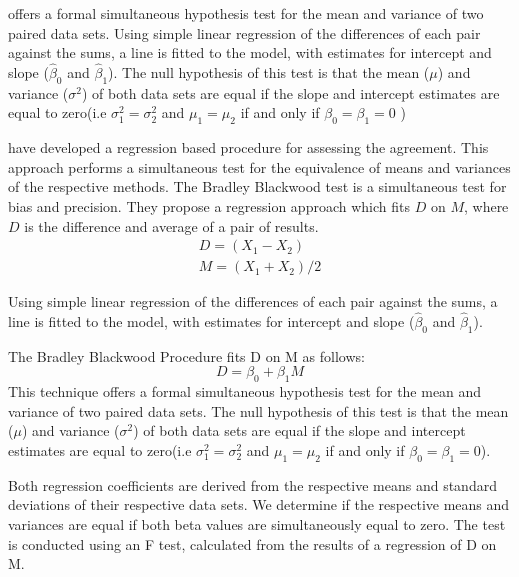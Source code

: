 \documentclass[12pt, a4paper]{report}
\theoremstyle{plain}
\theoremstyle{definition}
\theoremstyle{remark}
\begin{document}
\citet{BB89} offers a formal simultaneous hypothesis test for the
	mean and variance of two paired data sets. Using simple linear regression of the differences of each pair against the sums, a
	line is fitted to the model, with estimates for intercept and slope ($\hat{\beta}_{0}$ and $\hat{\beta}_{1}$). The null
	hypothesis of this test is that the mean ($\mu$) and variance
	($\sigma^{2}$) of both data sets are equal if the slope and intercept estimates are equal to zero(i.e $\sigma^{2}_{1} =
	\sigma^{2}_{2}$ and $\mu_{1}=\mu_{2}$ if and only if $\beta_{0}=
	\beta_{1}=0$ )	
	
	
	\citet{BB89} have developed a regression based procedure for
	assessing the agreement. This approach performs a simultaneous test for the equivalence of
	means and variances of the respective methods. The Bradley Blackwood test is a simultaneous test for bias and
	precision. They propose a regression approach which fits $D$ on $M$, where $D$ is the difference and average of a pair of results. 
	\begin{eqnarray}
	D = (X_{1}-X_{2}) \\
	M = (X_{1} + X_{2}) /2
	\end{eqnarray}
		
	Using simple linear regression of the differences of each pair against the sums, a line is fitted to the model, with estimates for intercept and slope ($\hat{\beta}_{0}$ and $\hat{\beta}_{1}$).

	The Bradley Blackwood Procedure fits D on M as follows:\\
	\begin{equation}
	D = \beta_{0} + \beta_{1}M
	\end{equation}
This technique offers a formal simultaneous hypothesis test for the mean and variance of two paired data sets. The null hypothesis of this test is that the mean ($\mu$) and variance ($\sigma^{2}$) of both data sets are equal if the slope and intercept estimates are equal to zero(i.e $\sigma^{2}_{1} =
	\sigma^{2}_{2}$ and $\mu_{1}=\mu_{2}$ if and only if $\beta_{0}=
	\beta_{1}=0$).
	
Both regression coefficients are derived from the respective means and
standard deviations of their respective data sets. We determine if the respective means and variances are equal if both beta values are simultaneously equal to zero. The test is conducted using an F test, calculated from the results of a regression of D on M.
	
\end{document}
